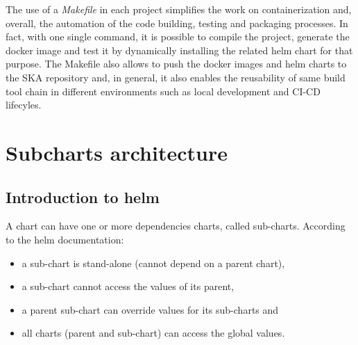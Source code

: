 \documentclass[a4paper]{spie}  %
\begin{document}
The use of a \textit{Makefile} in each project simplifies the work on containerization and, overall, the automation of the code building, testing and packaging processes. In fact, with one single command, it is possible to compile the project, generate the docker image and test it by dynamically installing the related helm chart for that purpose. 
The Makefile also allows to push the docker images and helm charts to the SKA repository and, in general, it also enables the reusability of same build tool chain in different environments such as local development and CI-CD lifecyles.




\section{Subcharts architecture}

\subsection{Introduction to helm}
A chart can have one or more dependencies charts, called sub-charts. According to the helm documentation:
\begin{itemize}
    \item a sub-chart is stand-alone (cannot depend on a parent chart),
    \item a sub-chart cannot access the values of its parent,
    \item a parent sub-chart can override values for its sub-charts and
    \item all charts (parent and sub-chart) can access the global values.
\end{itemize}
\end{document}
